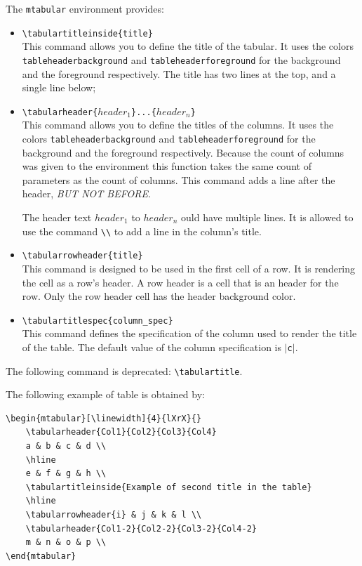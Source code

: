 \documentclass[book,taskpackage,specpackage,codepackage]{upmethodology-document}
\begin{document}
The \texttt{mtabular} environment provides:
\begin{itemize}
\item \texttt{{\textbackslash}tabulartitleinside\{title\}} \\
	This command allows you to define the title of the tabular. It uses the colors \texttt{tableheaderbackground} and \texttt{tableheaderforeground} for the background and the foreground respectively. The title has two lines at the top, and a single line below;

\item \texttt{{\textbackslash}tabularheader\{$header_1$\}...\{$header_n$\}} \\
	This command allows you to define the titles of the columns. It uses the colors \texttt{tableheaderbackground} and \texttt{tableheaderforeground} for the background and the foreground respectively. Because the count of columns was given to the environment this function takes the same count of parameters as the count of columns. This command adds a line after the header, \emph{BUT NOT BEFORE}.

\begin{upmnote}
	The header text $header_1$ to $header_n$ ould have multiple lines. It is allowed to use the command \texttt{{\textbackslash}{\textbackslash}} to add a line in the column's title.
\end{upmnote}

\item \texttt{{\textbackslash}tabularrowheader\{title\}} \\
	This command is designed to be used in the first cell of a row. It is rendering the cell as a row's header. A row header is a cell that is an header for the row. Only the row header cell has the header background color.

\item \texttt{{\textbackslash}tabulartitlespec\{column\_spec\}} \\
	This command defines the specification of the column used to render the title of the table.
	The default value of the column specification is $|$\texttt{c}$|$.

\end{itemize}

\begin{upmcaution}
	The following command is deprecated: \texttt{{\textbackslash}tabulartitle}.
\end{upmcaution}

The following example of table is obtained by: \\
\begin{verbatim}
\begin{mtabular}[\linewidth]{4}{lXrX}{}
	\tabularheader{Col1}{Col2}{Col3}{Col4}
	a & b & c & d \\
	\hline
	e & f & g & h \\
	\tabulartitleinside{Example of second title in the table}
	\hline
	\tabularrowheader{i} & j & k & l \\
	\tabularheader{Col1-2}{Col2-2}{Col3-2}{Col4-2}
	m & n & o & p \\
\end{mtabular}
\end{verbatim}
\end{document}

